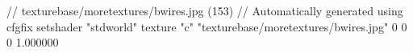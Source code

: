 // texturebase/moretextures/bwires.jpg (153)
// Automatically generated using cfgfix
setshader "stdworld"
texture "c" "texturebase/moretextures/bwires.jpg" 0 0 0 1.000000
